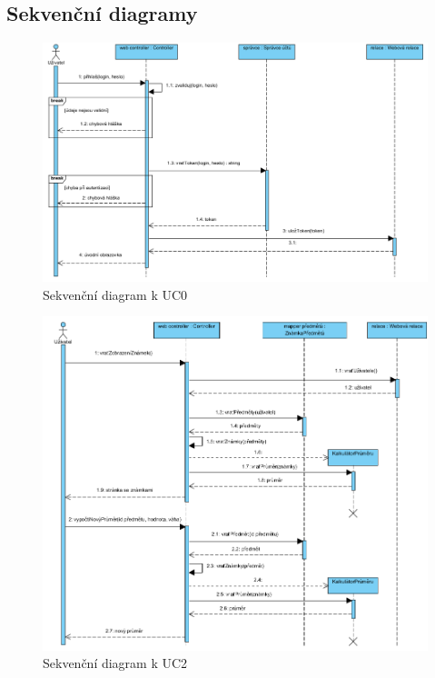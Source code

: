 \documentclass[a4paper,10pt,titlepage]{article}
\begin{document}
			\subsection{Sekvenční diagramy}
				\begin{figure}[H]
					\centering
							\includegraphics[width=\textwidth]{vis_sequence_diagram_uc0}
					\caption{Sekvenční diagram k UC0}
				\end{figure}
				\begin{figure}[H]
					\centering
							\includegraphics[width=\textwidth]{vis_sequence_diagram_uc2}
					\caption{Sekvenční diagram k UC2}
				\end{figure}
\end{document}

